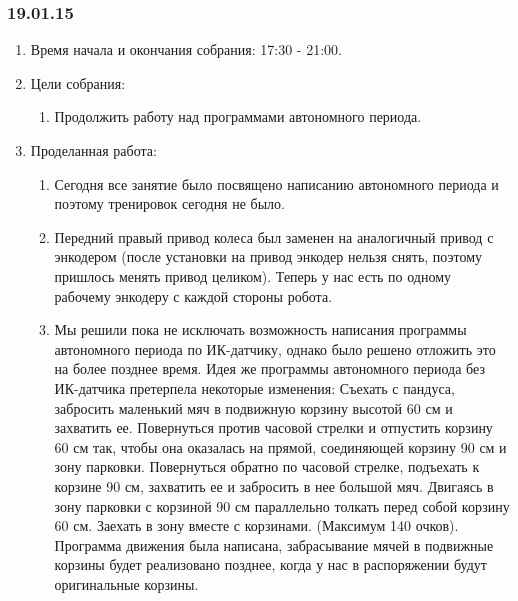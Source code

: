 \subsubsection{19.01.15}
\begin{enumerate}
	
	\item Время начала и окончания собрания: 17:30 - 21:00.
	
	\item Цели собрания: 
	\begin{enumerate}
		
		\item Продолжить работу над программами автономного периода.
		
	\end{enumerate}

	\item Проделанная работа:
	\begin{enumerate}
		
		\item Сегодня все занятие было посвящено написанию автономного периода и поэтому тренировок сегодня не было.
		
		\item Передний правый привод колеса был заменен на аналогичный привод с энкодером (после установки на привод энкодер нельзя снять, поэтому пришлось менять привод целиком). Теперь у нас есть по одному рабочему энкодеру с каждой стороны робота.
		
		\item Мы решили пока не исключать возможность написания программы автономного периода по ИК-датчику, однако было решено отложить это на более позднее время. Идея же программы автономного периода без ИК-датчика претерпела некоторые изменения:  Съехать с пандуса, забросить маленький мяч в подвижную корзину высотой 60 см и захватить ее. Повернуться против часовой стрелки и отпустить корзину 60 см так, чтобы она оказалась на прямой, соединяющей корзину 90 см и зону парковки. Повернуться обратно по часовой стрелке, подъехать к корзине 90 см, захватить ее и забросить в нее большой мяч. Двигаясь в зону парковки с корзиной 90 см параллельно толкать перед собой корзину 60 см. Заехать в зону вместе с корзинами. (Максимум 140 очков). Программа движения была написана, забрасывание мячей в подвижные корзины будет реализовано позднее, когда у нас в распоряжении будут оригинальные корзины.
		

\end{enumerate}
\end{enumerate}
